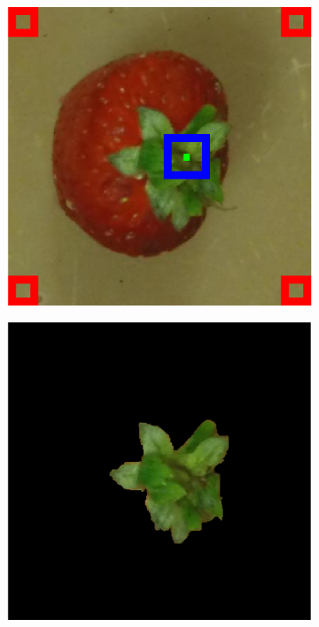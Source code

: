 \documentclass {udthesis}
\begin{document}
\begin{figure}
  \centering
  \begin{subfigure}[]{0.2\textwidth}
      \includegraphics[width=\textwidth]{distdes_annotation_bad_visualattn_seeds}
      \caption{}
      \label{fig:bad_seg_visualattn_seeds}
  \end{subfigure}
  \begin{subfigure}[]{0.2\textwidth}
      \includegraphics[width=\textwidth]{distdes_annotation_bad_recursive_segment}

\end{subfigure}
\end{figure}
\end{document}
